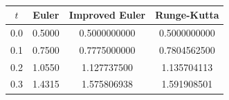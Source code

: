 \item
${ }$\\[-2ex]

\begin{tabular}{|c|c|c|c|}
\hline
$t$ &Euler&Improved Euler&Runge-Kutta\\
\hline
0.0 & 0.5000 & 0.5000000000 & 0.5000000000 \\
0.1 & 0.7500 & 0.7775000000 & 0.7804562500 \\
0.2 & 1.0550 & 1.127737500  & 1.135704113  \\
0.3 & 1.4315 & 1.575806938  & 1.591908501  \\
\hline
\end{tabular}









